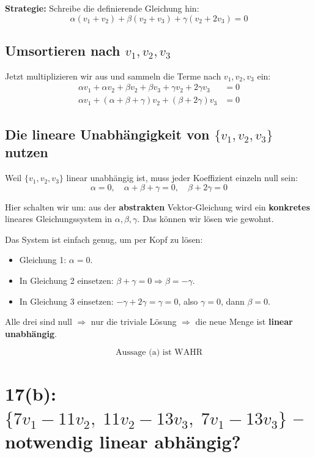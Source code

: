 \documentclass[a4paper,12pt]{article}
\begin{document}
\textbf{Strategie:} Schreibe die definierende Gleichung hin:
\[
\alpha(v_1+v_2) + \beta(v_2+v_3) + \gamma(v_2+2v_3) = 0
\]

\subsection*{Umsortieren nach $v_1, v_2, v_3$}

Jetzt multiplizieren wir aus und sammeln die Terme nach $v_1, v_2, v_3$ ein:
\begin{align*}
\alpha v_1 + \alpha v_2 + \beta v_2 + \beta v_3 + \gamma v_2 + 2\gamma v_3 &= 0 \\
\alpha v_1 + (\alpha + \beta + \gamma) v_2 + (\beta + 2\gamma) v_3 &= 0
\end{align*}

\subsection*{Die lineare Unabh\"angigkeit von $\{v_1, v_2, v_3\}$ nutzen}

Weil $\{v_1, v_2, v_3\}$ linear unabh\"angig ist, muss jeder Koeffizient einzeln null sein:
\[
\alpha = 0, \quad \alpha + \beta + \gamma = 0, \quad \beta + 2\gamma = 0
\]

\begin{merkbox}[title={Der Schl\"usselschritt}]
Hier schalten wir um: aus der \textbf{abstrakten} Vektor-Gleichung wird ein \textbf{konkretes} lineares Gleichungssystem in $\alpha, \beta, \gamma$. Das k\"onnen wir l\"osen wie gewohnt.
\end{merkbox}

Das System ist einfach genug, um per Kopf zu l\"osen:
\begin{itemize}[nosep]
    \item Gleichung 1: $\alpha = 0$.
    \item In Gleichung 2 einsetzen: $\beta + \gamma = 0 \Rightarrow \beta = -\gamma$.
    \item In Gleichung 3 einsetzen: $-\gamma + 2\gamma = \gamma = 0$, also $\gamma = 0$, dann $\beta = 0$.
\end{itemize}

Alle drei sind null $\Rightarrow$ nur die triviale L\"osung $\Rightarrow$ die neue Menge ist \textbf{linear unabh\"angig}.

\[
\boxed{\text{Aussage (a) ist WAHR}}
\]

\section*{17(b): $\{7v_1 - 11v_2,\; 11v_2 - 13v_3,\; 7v_1 - 13v_3\}$ -- notwendig linear abh\"angig?}
\end{document}
